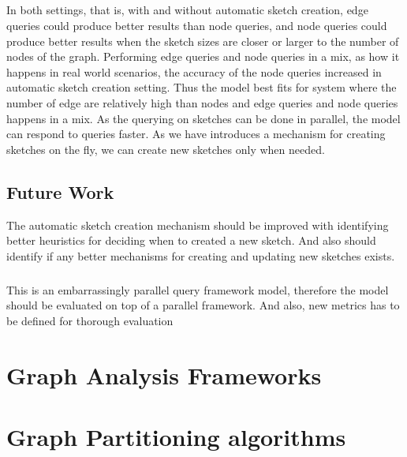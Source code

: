 \documentclass[12pt]{report}
\numberwithin{figure}{section}
\numberwithin{table}{section}
\begin{document}
\paragraph{}

In both settings, that is, with and without automatic sketch creation, edge queries could produce better results than node queries, and node queries could produce better results when the sketch sizes are closer or larger to the number of nodes of the graph. Performing edge queries and node queries in a mix, as how it happens in real world scenarios, the accuracy of the node queries  increased in automatic sketch creation setting. Thus the model best fits for system where the number of edge are relatively high than nodes and edge queries and node queries happens in a mix. As the querying on sketches can be done in parallel, the model can respond to queries faster. As we have introduces a mechanism for creating sketches on the fly, we can create new sketches only when needed.

\section{Future Work}

The automatic sketch creation mechanism should be improved with identifying better heuristics for deciding when to created a new sketch. And also should identify if any better mechanisms for creating  and  updating  new sketches exists.  

\paragraph{}
This is an embarrassingly parallel query framework model, therefore the model should be evaluated on top of a parallel framework. And also, new metrics has to be defined for thorough evaluation

\newpage
\begin{appendices}


\chapter{Graph Analysis Frameworks}



\chapter{Graph Partitioning algorithms}




\end{appendices}
\end{document}
